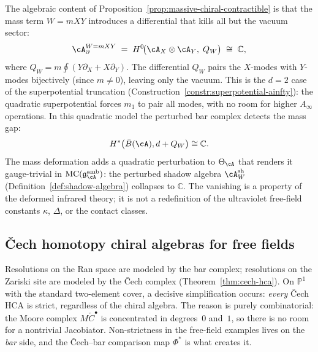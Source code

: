 \begin{remark}
\label{rem:massive-boundary-quotient}
The algebraic content of
Proposition~\ref{prop:massive-chiral-contractible} is that the mass
term $W = mXY$ introduces a differential that kills all but the
vacuum sector:
\begin{equation}\label{eq:massive-boundary-quotient}
 \cA_\partial^{W=mXY}
 \;=\;
 H^0\!\bigl(\cA_{X} \otimes \cA_{Y},\; Q_{W}\bigr)
 \;\cong\;
 \mathbb{C},
\end{equation}
where $Q_W = m\oint(Y\partial_X + X\partial_Y)$. The differential
$Q_W$ pairs the $X$-modes with $Y$-modes bijectively (since $m
\neq 0$), leaving only the vacuum. This is the $d = 2$ case of the
superpotential truncation (Construction~\ref{constr:superpotential-ainfty}):
the quadratic superpotential forces $m_1$ to pair all modes, with no
room for higher $A_\infty$ operations. In this quadratic model the
perturbed bar complex detects the mass gap:
\[
H^*\bigl(\bar{B}(\cA),d+Q_W\bigr) \cong \mathbb{C}.
\]
The mass deformation adds a quadratic perturbation to
$\Theta_{\cA}$ that renders it gauge-trivial in
$\operatorname{MC}(\mathfrak{g}^{\mathrm{amb}}_{\cA})$: the
perturbed shadow algebra $\cA^{\mathrm{sh}}_{W}$
(Definition~\ref{def:shadow-algebra}) collapses to
$\mathbb{C}$. The vanishing is a property of the deformed infrared
theory; it is not a redefinition of the ultraviolet free-field
constants $\kappa$, $\Delta$, or the contact classes.
\end{remark}


\subsection{\v{C}ech homotopy chiral algebras for free fields}
\label{subsec:cech-hca-free-fields}

Resolutions on the Ran space are modeled by the bar complex; resolutions
on the Zariski site are modeled by the \v{C}ech complex (Theorem~\ref{thm:cech-hca}). On $\mathbb{P}^1$ with the standard two-element
cover, a decisive simplification occurs: \emph{every} \v{C}ech HCA
is strict, regardless of the chiral algebra. The reason is
purely combinatorial: the Moore complex $M\check{C}^\bullet$ is
concentrated in degrees~$0$ and~$1$, so there is no room for
a nontrivial Jacobiator. Non-strictness in the free-field
examples lives on the \emph{bar} side, and the \v{C}ech--bar
comparison map $\Phi^*$ is what creates it.

